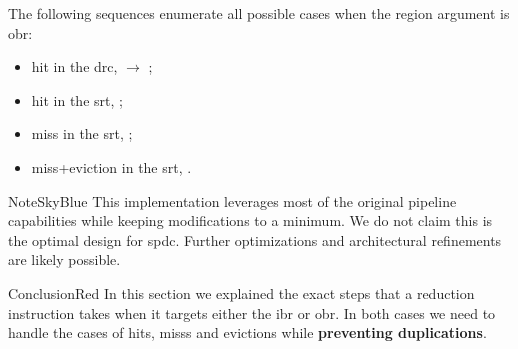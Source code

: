 \noindent The following sequences enumerate all possible cases when the region argument is \acrshort{obr}:
\begin{itemize}
    \item \gls{hit} in the \acrshort{drc},  $\rightarrow$ ;
    \item \gls{hit} in the \acrshort{srt}, ;
    \item \gls{miss} in the \acrshort{srt}, ;
    \item \gls{miss}+\gls{eviction} in the \acrshort{srt}, .
\end{itemize}

\begin{highlight}{Note}{SkyBlue}
    This implementation leverages most of the original \gls{pipeline} capabilities while keeping modifications to a minimum.
    We do not claim this is the optimal design for \acrlong{spdc}.
    Further optimizations and architectural refinements are likely possible.
\end{highlight}

\begin{highlight}{Conclusion}{Red}
    In this section we explained the exact steps that a \gls{reduction} instruction takes when it targets either the \acrshort{ibr} or \acrshort{obr}.
    In both cases we need to handle the cases of \glspl{hit}, \glspl{miss} and \glspl{eviction} while \textbf{preventing duplications}.
\end{highlight}